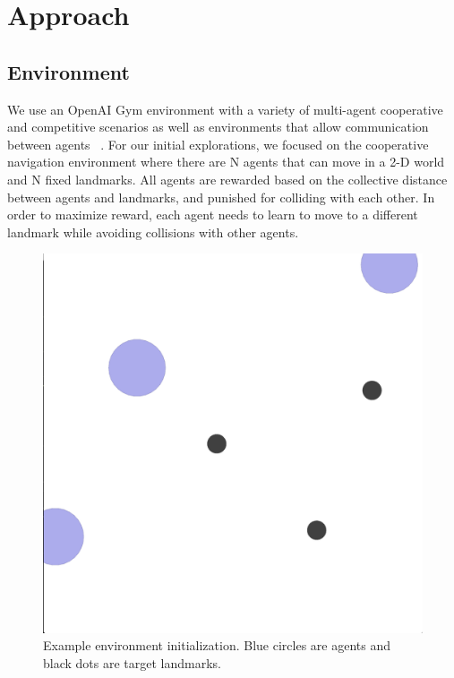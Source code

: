 \documentclass{article}
\begin{document}
\section{Approach}

\subsection{Environment}

We use an OpenAI Gym environment with a variety of multi-agent cooperative and competitive scenarios as well as environments that allow communication between agents ~\cite{openaigym}. For our initial explorations, we focused on the cooperative navigation environment where there are N agents that can move in a 2-D world and N fixed landmarks. All agents are rewarded based on the collective distance between agents and landmarks, and punished for colliding with each other. In order to maximize reward, each agent needs to learn to move to a different landmark while avoiding collisions with other agents.

\begin{figure}
\begin{center}
\includegraphics[scale=0.15]{env-image}
\end{center}
\caption{Example environment initialization. Blue circles are agents and black dots are target landmarks.}
\end{figure}
\end{document}
